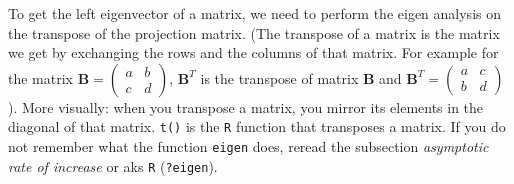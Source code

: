\documentclass{article}\usepackage[]{graphicx}\usepackage[]{color}
\begin{document}
To get the left eigenvector of a matrix, we need to perform the eigen analysis on the transpose of the projection matrix. (The transpose of a matrix is the matrix we get by exchanging the rows and the columns of that matrix. For example for the matrix $\boldsymbol{B}=\begin{pmatrix}a & b\\ c & d\end{pmatrix}$, $\boldsymbol{B}^T$ is the transpose of matrix $\boldsymbol{B}$ and $\boldsymbol{B}^T=\begin{pmatrix}a & c\\ b & d\end{pmatrix}$). More visually: when you transpose a matrix, you mirror its elements in the diagonal of that matrix. \texttt{t()} is the \texttt{R} function that transposes a matrix. If you do not remember what the function \texttt{eigen} does, reread the subsection \textit{asymptotic rate of increase} or aks \texttt{R} (\texttt{?eigen}).
\end{document}
